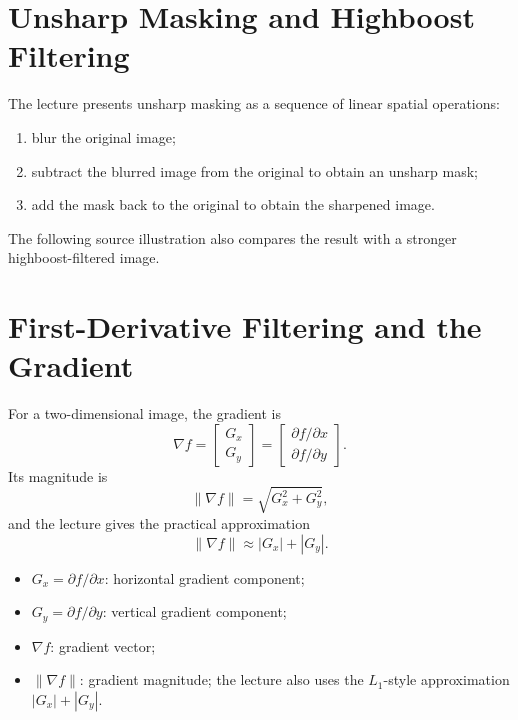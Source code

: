 \documentclass[11pt,a4paper,oneside]{report}
\newcommand{\mathlegend}[1]{%
  \par\vspace{0.2em}{\small\itshape where}\par
  \begin{itemize}[leftmargin=1.7em,topsep=0.15em,itemsep=0.12em]
  #1
  \end{itemize}
}
\begin{document}


\section{Unsharp Masking and Highboost Filtering}

The lecture presents unsharp masking as a sequence of linear spatial operations:
\begin{enumerate}
  \item blur the original image;
  \item subtract the blurred image from the original to obtain an unsharp mask;
  \item add the mask back to the original to obtain the sharpened image.
\end{enumerate}
The following source illustration also compares the result with a stronger highboost-filtered image.



\section{First-Derivative Filtering and the Gradient}

For a two-dimensional image, the gradient is
\begin{equation}
  \nabla f=
  \begin{bmatrix}G_x\\G_y\end{bmatrix}
  =
  \begin{bmatrix}\partial f/\partial x\\\partial f/\partial y\end{bmatrix}.
  \label{eq:image-gradient}
\end{equation}
Its magnitude is
\begin{equation}
  \lVert\nabla f\rVert=\sqrt{G_x^2+G_y^2},
  \label{eq:gradient-magnitude}
\end{equation}
and the lecture gives the practical approximation
\begin{equation}
  \lVert\nabla f\rVert\approx |G_x|+|G_y|.
  \label{eq:gradient-approx}
\end{equation}
\mathlegend{
  \item $G_x=\partial f/\partial x$: horizontal gradient component;
  \item $G_y=\partial f/\partial y$: vertical gradient component;
  \item $\nabla f$: gradient vector;
  \item $\lVert\nabla f\rVert$: gradient magnitude; the lecture also uses the $L_1$-style approximation $|G_x|+|G_y|$.
}
\end{document}
